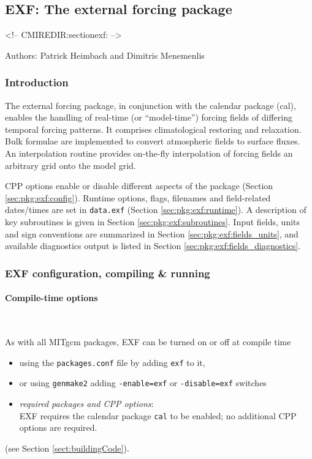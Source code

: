 \subsection{EXF: The external forcing package
\label{sec:pkg:exf}}
\begin{rawhtml}
<!-- CMIREDIR:sectionexf: -->
\end{rawhtml}

Authors: Patrick Heimbach and Dimitris Menemenlis

\subsubsection{Introduction
\label{sec:pkg:exf:intro}}

The external forcing package, in conjunction with the
calendar package (cal), enables the handling of real-time
(or ``model-time'') forcing
fields of differing temporal forcing patterns.
It comprises climatological restoring and relaxation.
Bulk formulae are implemented to convert atmospheric fields
to surface fluxes.
An interpolation routine provides on-the-fly interpolation of
forcing fields an arbitrary grid onto the model grid.

CPP options enable or disable different aspects of the package
(Section \ref{sec:pkg:exf:config}).
Runtime options, flags, filenames and field-related dates/times are
set in \texttt{data.exf}
(Section \ref{sec:pkg:exf:runtime}).
A description of key subroutines is given in Section
\ref{sec:pkg:exf:subroutines}.
Input fields, units and sign conventions are summarized in
Section \ref{sec:pkg:exf:fields_units}, and available diagnostics
output is listed in Section \ref{sec:pkg:exf:fields_diagnostics}.


\subsubsection{EXF configuration, compiling \& running}

\paragraph{Compile-time options
\label{sec:pkg:exf:config}}
~

As with all MITgcm packages, EXF can be turned on or off at compile time
%
\begin{itemize}
%
\item
using the \texttt{packages.conf} file by adding \texttt{exf} to it,
%
\item
or using \texttt{genmake2} adding
\texttt{-enable=exf} or \texttt{-disable=exf} switches
%
\item
\textit{required packages and CPP options}: \\
EXF requires the calendar package \texttt{cal} to be enabled;
no additional CPP options are required.
%
\end{itemize}
(see Section \ref{sect:buildingCode}).

